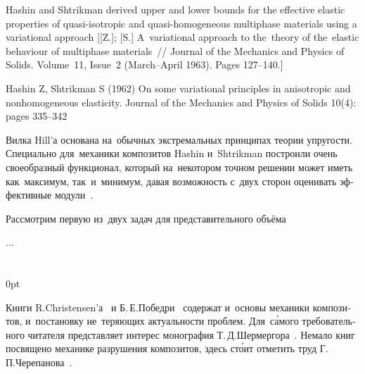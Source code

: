 
{\small
\noindent
Hashin and Shtrikman derived upper and lower bounds for the effective elastic properties of quasi-isotropic and quasi-homogeneous multiphase materials using a variational approach [[Z.]; [S.] A~variational approach to the~theory of the~elastic behaviour of multiphase materials~// Journal of the Mechanics and Physics of Solids. Volume~11, Issue~2 (March--April 1963). Pages 127\hbox{--}140.]

Hashin Z, Shtrikman S (1962) On some variational principles in anisotropic and nonhomogeneous elasticity. Journal of the Mechanics and Physics of Solids 10(4): pages 335–342
\par}

\begin{otherlanguage}{russian}

Вилка Hill’а основана на~обычных экстремальных принципах теории упругости. Специально для~механики композитов Hashin и~Shtrikman построили очень своеобразный функционал, который на~некотором точном решении может иметь как~максимум, так~и~минимум, давая возможность с~двух сторон оценивать эффективные модули~\cite{shermergor}.

Рассмотрим первую из~двух задач для представительного объёма

...



\end{otherlanguage}

\section*{\small \wordforbibliography}

\begin{changemargin}{\parindent}{0pt}
\fontsize{10}{12}\selectfont

\begin{otherlanguage}{russian}

Книги R.\:Christensen’а~\cite{christensen-compositematerials} и Б.\,Е.\:Победри~\cite{pobedrya-composites} содержат и~основы механики композитов, и~постановку не~теряющих актуальности проблем. Для~с\'{а}мого требовательного читателя представляет интерес монография Т.\,Д.\:Шермергора~\cite{shermergor}. Немало книг посвящено механике разрушения композитов, здесь ст\'{о}ит отметить труд Г.\,П.\:Черепанова~\cite{cherepanov-compositematerialfracture}.

\end{otherlanguage}

\end{changemargin}

